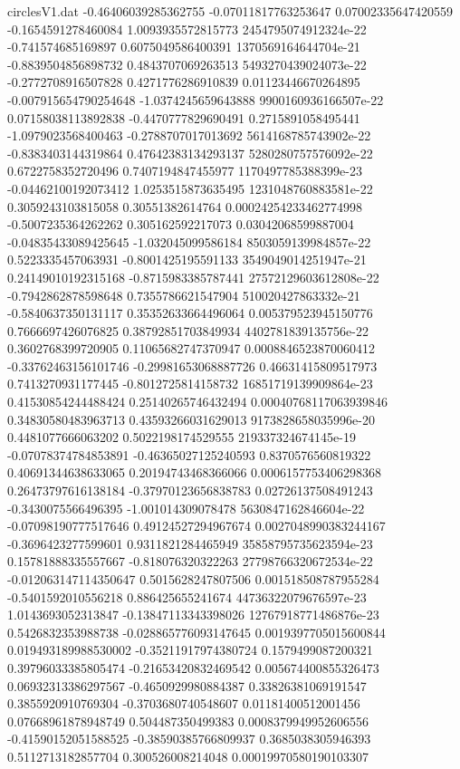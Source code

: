 \begin{filecontents}{circlesV1.dat}
-0.46406039285362755	-0.07011817763253647	0.07002335647420559
-0.1654591278460084	1.0093935572815773	2454795074912324e-22
-0.741574685169897	0.6075049586400391	1370569164644704e-21
-0.8839504856898732	0.4843707069263513	5493270439024073e-22
-0.2772708916507828	0.4271776286910839	0.01123446670264895
-0.007915654790254648	-1.0374245659643888	9900160936166507e-22
0.07158038113892838	-0.4470777829690491	0.2715891058495441
-1.0979023568400463	-0.2788707017013692	5614168785743902e-22
-0.8383403144319864	0.47642383134293137	5280280757576092e-22
0.6722758352720496	0.7407194847455977	1170497785388399e-23
-0.04462100192073412	1.0253515873635495	1231048760883581e-22
0.3059243103815058	0.30551382614764	0.00024254233462774998
-0.5007235364262262	0.305162592217073	0.03042068599887004
-0.04835433089425645	-1.032045099586184	8503059139984857e-22
0.5223335457063931	-0.8001425195591133	3549049014251947e-21
0.24149010192315168	-0.8715983385787441	27572129603612808e-22
-0.7942862878598648	0.7355786621547904	510020427863332e-21
-0.5840637350131117	0.35352633664496064	0.005379523945150776
0.7666697426076825	0.38792851703849934	4402781839135756e-22
0.3602768399720905	0.11065682747370947	0.0008846523870060412
-0.33762463156101746	-0.29981653068887726	0.46631415809517973
0.7413270931177445	-0.8012725814158732	16851719139909864e-23
0.41530854244488424	0.25140265746432494	0.00040768117063939846
0.34830580483963713	0.43593266031629013	9173828658035996e-20
0.4481077666063202	0.5022198174529555	219337324674145e-19
-0.07078374784853891	-0.46365027125240593	0.8370576560819322
0.40691344638633065	0.20194743468366066	0.0006157753406298368
0.26473797616138184	-0.37970123656838783	0.02726137508491243
-0.3430075566496395	-1.001014309078478	5630847162846604e-22
-0.07098190777517646	0.49124527294967674	0.0027048990383244167
-0.3696423277599601	0.9311821284465949	35858795735623594e-23
0.15781888335557667	-0.818076320322263	27798766320672534e-22
-0.012063147114350647	0.5015628247807506	0.001518508787955284
-0.5401592010556218	0.886425655241674	44736322079676597e-23
1.0143693052313847	-0.13847113343398026	12767918771486876e-23
0.5426832353988738	-0.028865776093147645	0.0019397705015600844
0.019493189988530002	-0.35211917974380724	0.1579499087200321
0.39796033385805474	-0.21653420832469542	0.005674400855326473
0.06932313386297567	-0.4650929980884387	0.33826381069191547
0.3855920910769304	-0.3703680740548607	0.01181400512001456
0.07668961878948749	0.504487350499383	0.0008379949952606556
-0.41590152051588525	-0.38590385766809937	0.3685038305946393
0.5112713182857704	0.300526008214048	0.00019970580190103307

\end{filecontents}
